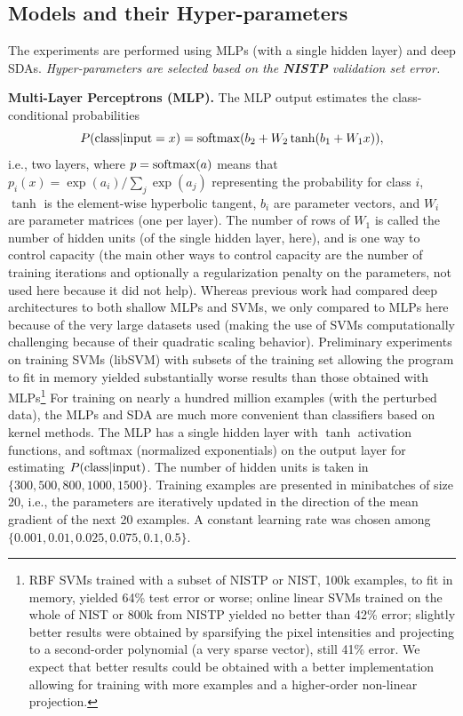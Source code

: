 \documentclass{article} %
\begin{document}
\vspace*{-3mm}
\subsection{Models and their Hyper-parameters}

The experiments are performed using MLPs (with a single
hidden layer) and deep SDAs.
\emph{Hyper-parameters are selected based on the {\bf NISTP} validation set error.}

{\bf Multi-Layer Perceptrons (MLP).}  The MLP output estimates the
class-conditional probabilities
\[
P({\rm class}|{\rm input}=x)={\rm softmax}(b_2+W_2\tanh(b_1+W_1 x)),
\] 
i.e., two layers, where $p={\rm softmax}(a)$ means that 
$p_i(x)=\exp(a_i)/\sum_j \exp(a_j)$
representing the probability 
for class $i$, $\tanh$ is the element-wise
hyperbolic tangent, $b_i$ are parameter vectors, and $W_i$ are 
parameter matrices (one per layer). The
number of rows of $W_1$ is called the number of hidden units (of the
single hidden layer, here), and
is one way to control capacity (the main other ways to control capacity are
the number of training iterations and optionally a regularization penalty
on the parameters, not used here because it did not help).
Whereas previous work had compared
deep architectures to both shallow MLPs and SVMs, we only compared to MLPs
here because of the very large datasets used (making the use of SVMs
computationally challenging because of their quadratic scaling
behavior). Preliminary experiments on training SVMs (libSVM) with subsets
of the training set allowing the program to fit in memory yielded
substantially worse results than those obtained with MLPs\footnote{RBF SVMs
  trained with a subset of NISTP or NIST, 100k examples, to fit in memory,
  yielded 64\% test error or worse; online linear SVMs trained on the whole
  of NIST or 800k from NISTP yielded no better than 42\% error; slightly
  better results were obtained by sparsifying the pixel intensities and
  projecting to a second-order polynomial (a very sparse vector), still
  41\% error. We expect that better results could be obtained with a
  better implementation allowing for training with more examples and
  a higher-order non-linear projection.}  For training on nearly a hundred million examples (with the
perturbed data), the MLPs and SDA are much more convenient than classifiers
based on kernel methods.  The MLP has a single hidden layer with $\tanh$
activation functions, and softmax (normalized exponentials) on the output
layer for estimating $P({\rm class} | {\rm input})$.  The number of hidden units is
taken in $\{300,500,800,1000,1500\}$.  Training examples are presented in
minibatches of size 20, i.e., the parameters are iteratively updated in the direction
of the mean gradient of the next 20 examples. A constant learning rate was chosen among $\{0.001,
0.01, 0.025, 0.075, 0.1, 0.5\}$.
\end{document}
